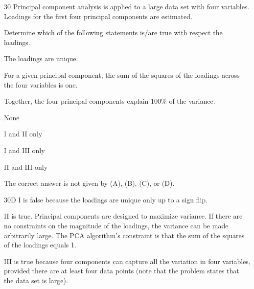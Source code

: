 \begin{question}{30}
Principal component analysis is applied to a large data set with four variables. Loadings for the first four principal components are estimated.

Determine which of the following statements is/are true with respect the loadings.
\begin{statements}
\item The loadings are unique.
\item For a given principal component, the sum of the squares of the loadings across the four variables is one.
\item Together, the four principal components explain 100\% of the variance.
\end{statements}

\begin{choices}
\item None
\item I and II only
\item I and III only
\item II and III only
\item The correct answer is not given by (A), (B), (C), or (D).
\end{choices}
\end{question}
\begin{solution}{30}{D}
I is false because the loadings are unique only up to a sign flip.

II is true. Principal components are designed to maximize variance. If there are no constraints on the magnitude of the loadings, the variance can be made arbitrarily large. The PCA algorithm's constraint is that the sum of the squares of the loadings equals 1.

III is true because four components can capture all the variation in four variables, provided there are at least four data points (note that the problem states that the data set is large).
\end{solution}

